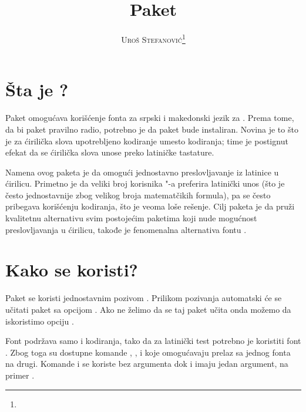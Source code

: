 \documentclass[12pt]{article}
\title{Paket \lat{\textbf{srbtiks}}}
\author{\textsc{Uroš Stefanović}\footnote{\lat{urostajms@gmail.com}}}
\begin{document}
\maketitle

\section{Šta je ?}

Paket \textbf{} omogućava korišćenje fonta \textbf{} za srpski i makedonski jezik za \lat{\TeX{} (\LaTeX)}.
Prema tome, da bi paket pravilno radio, potrebno je da paket \textbf{ }bude instaliran.
Novina je to što je za ćirilička slova upotrebljeno kodiranje \emph{} umesto \emph{} kodiranja;
time je postignut efekat da se ćirilička slova unose preko latiničke tastature.

Namena ovog paketa je da omogući jednostavno preslovljavanje iz latinice u ćirilicu.
Primetno je da veliki broj korisnika \lat{\LaTeX}"-a preferira latinički unos
(što je često jednostavnije zbog velikog broja matematčikih formula),
pa se često pribegava korišćenju \emph{} kodiranja, što je veoma loše rešenje.
Cilj paketa \textbf{} je da pruži kvalitetnu alternativu svim postojećim paketima koji nude mogućnost preslovljavanja u ćirilicu, takođe je fenomenalna alternativa fontu \emph{}.

\section{Kako se koristi?}

Paket se koristi jednostavnim pozivom \textbf{}.
Prilikom pozivanja automatski će se učitati paket \textbf{} sa opcijom \textbf{}.
Ako ne želimo da se taj paket učita onda možemo da iskoristimo opciju \textbf{}.

Font \textbf{} podržava samo \emph{} i \emph{} kodiranja, tako da za latinički test potrebno je koristiti font \textbf{}.
Zbog toga su dostupne komande \textbf{}, \textbf{}, \textbf{} i \textbf{} koje omogućavaju prelaz sa jednog fonta na drugi.
Komande \textbf{} i \textbf{} se koriste bez argumenta dok \textbf{} i \textbf{} imaju jedan argument, na primer \textbf{}.
\end{document}
